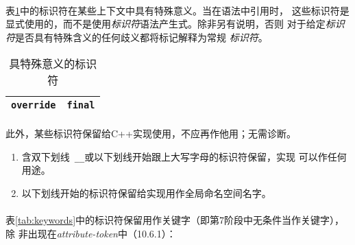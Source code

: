 \paragraph{}
表\ref{tab:special-ids}中的标识符在某些上下文中具有特殊意义。当在语法中引用时，
这些标识符是显式使用的，而不是使用\textit{标识符}语法产生式。除非另有说明，否则
对于给定\textit{标识符}是否具有特殊含义的任何歧义都将标记解释为常规
\textit{标识符}。

\begin{table}[h!]
  \centering
  \caption{具特殊意义的标识符}
  \begin{tabular}{|ll|}
    \hline
    \texttt{override} & \texttt{final} \\
    \hline
  \end{tabular}
  \label{tab:special-ids}
\end{table}

\paragraph{}
此外，某些标识符保留给C++实现使用，不应再作他用；无需诊断。
\begin{enumerate}
  \item{含双下划线\ \texttt{\_\_}或以下划线开始跟上大写字母的标识符保留，实现
    可以作任何用途。}
  \item{以下划线开始的标识符保留给实现用作全局命名空间名字。}
\end{enumerate}

\paragraph{}
表\ref{tab:keywords}中的标识符保留用作关键字（即第7阶段中无条件当作关键字），除
非出现在\textit{attribute-token}中（10.6.1）：


